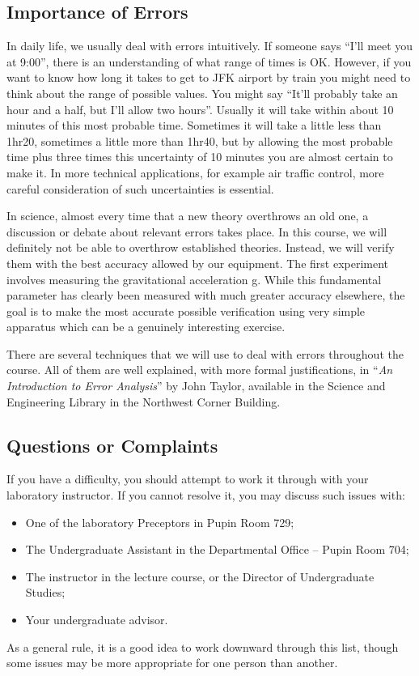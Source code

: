 \subsection{Importance of Errors}

In daily life, we usually deal with errors intuitively. If someone says ``I'll meet you at 9:00'', there is an understanding of what range of times is OK. However, if you want to know how long it takes to get to JFK airport by train you might need to think about the range of possible values. You might say ``It'll probably take an hour and a half, but I'll allow two hours''. Usually it will take within about 10 minutes of this most probable time. Sometimes it will take a little less than 1hr20, sometimes a little more than 1hr40, but by allowing the most probable time plus three times this uncertainty of 10 minutes you are almost certain to make it. In more technical applications, for example air traffic control, more careful consideration of such uncertainties is essential.\myskip

In science, almost every time that a new theory overthrows an old one, a discussion or debate about relevant errors takes place. In this course, we will definitely not be able to overthrow established theories. Instead, we will verify them with the best accuracy allowed by our equipment. The first experiment involves measuring the gravitational acceleration g. While this fundamental parameter has clearly been measured with much greater accuracy elsewhere, the goal is to make the most accurate possible verification using very simple apparatus which can be a genuinely interesting exercise.\myskip

There are several techniques that we will use to deal with errors throughout the course. All of them are well explained, with more formal justifications, in ``\emph{An Introduction to Error Analysis}'' by John Taylor, available in the Science and Engineering Library in the Northwest Corner Building.

\subsection{Questions or Complaints}

If you have a difficulty, you should attempt to work it through with your laboratory instructor.  If you cannot resolve it, you may discuss such issues with:

\begin{itemize}
    \item One of the laboratory Preceptors in Pupin Room 729;

    \item The Undergraduate Assistant in the Departmental Office -- Pupin Room 704;

    \item The instructor in the lecture course, or the Director of Undergraduate Studies;

    \item Your undergraduate advisor.
\end{itemize}

As a general rule, it is a good idea to work downward through this list, though some issues may be more appropriate for one person than another.


